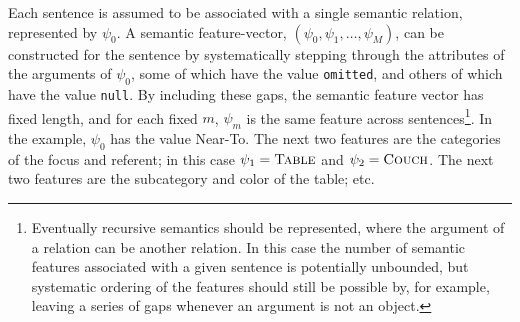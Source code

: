 \documentclass[12pt]{article}
\begin{document}
Each sentence is assumed to be associated with a single semantic relation, represented by $\psi_0$.  A semantic feature-vector, $(\psi_0, \psi_1, \dots, \psi_M)$, can be constructed for the sentence by systematically stepping through the attributes of the arguments of $\psi_0$, some of which have the value {\tt omitted}, and others of which have the value {\tt null}.  By including these gaps, the semantic feature vector has fixed length, and for each fixed $m$, $\psi_m$ is the same feature across sentences\footnote{Eventually recursive semantics should be represented, where the argument of a relation can be another relation.  In this case the number of semantic features associated with a given sentence is potentially unbounded, but systematic ordering of the features should still be possible by, for example, leaving a series of gaps whenever an argument is not an object.}.  In the example, $\psi_0$ has the value {\sc Near-To}.  The next two features are the categories of the focus and referent; in this case $\psi_1 = \textsc{Table}$ and $\psi_2 = \textsc{Couch}$.  The next two features are the subcategory and color of the table; etc.
\end{document}
